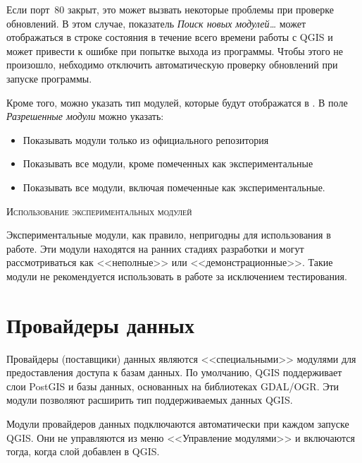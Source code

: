 Если порт~80 закрыт, это может вызвать некоторые проблемы при
проверке обновлений. В этом случае, показатель
\textit{Поиск новых модулей\ldots} может отображаться в строке состояния
в течение всего времени работы с QGIS и может привести к ошибке при
попытке выхода из программы. Чтобы этого не произошло, небходимо
отключить автоматическую проверку обновлений при запуске программы.

Кроме того, можно указать тип модулей, которые будут отображатся в
. В поле \textit{Разрешенные модули} можно
указать:

\begin{itemize}[label=--]
\item Показывать модули только из официального репозитория
\item Показывать все модули, кроме помеченных как экспериментальные
\item Показывать все модули, включая помеченные как экспериментальные.
\end{itemize}

\begin{Tip}
 \caption{\textsc{Использование экспериментальных модулей}}
Экспериментальные модули, как правило, непригодны для использования в
работе. Эти модули находятся на ранних стадиях разработки и могут
рассмотриваться как <<неполные>> или <<демонстрационные>>. Такие модули
не рекомендуется использовать в работе за исключением тестирования.
\end{Tip}

\section{Провайдеры данных}

Провайдеры (поставщики) данных являются <<специальными>> модулями для
предоставления доступа к базам данных. По умолчанию, QGIS поддерживает
слои PostGIS и базы данных, основанных на библиотеках GDAL/OGR.
Эти модули позволяют расширить тип поддерживаемых данных QGIS.

Модули провайдеров данных подключаются автоматически при каждом запуске
QGIS. Они не управляются из меню <<Управление модулями>> и включаются
тогда, когда слой добавлен в QGIS.

\FloatBarrier
